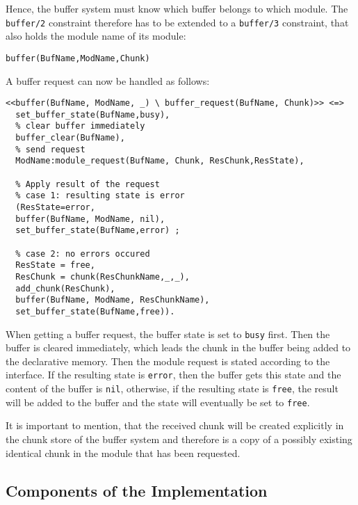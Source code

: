 Hence, the buffer system must know which buffer belongs to which module. The \lstinline|buffer/2| constraint therefore has to be extended to a \lstinline|buffer/3| constraint, that also holds the module name of its module:

\begin{lstlisting}
buffer(BufName,ModName,Chunk)
\end{lstlisting}

A buffer request can now be handled as follows:

\begin{lstlisting}[caption={Retrieval Request in CHR}, label=lst:retrieval_request_symbolic]
<<buffer(BufName, ModName, _) \ buffer_request(BufName, Chunk)>> <=>
  set_buffer_state(BufName,busy),
  % clear buffer immediately
  buffer_clear(BufName), 
  % send request
  ModName:module_request(BufName, Chunk, ResChunk,ResState),
  
  % Apply result of the request
  % case 1: resulting state is error
  (ResState=error, 
  buffer(BufName, ModName, nil),
  set_buffer_state(BufName,error) ;
  
  % case 2: no errors occured
  ResState = free,
  ResChunk = chunk(ResChunkName,_,_),
  add_chunk(ResChunk), 
  buffer(BufName, ModName, ResChunkName),
  set_buffer_state(BufName,free)).
\end{lstlisting}

When getting a buffer request, the buffer state is set to \lstinline|busy| first. Then the buffer is cleared immediately, which leads the chunk in the buffer being added to the declarative memory. Then the module request is stated according to the interface. If the resulting state is \lstinline|error|, then the buffer gets this state and the content of the buffer is \lstinline|nil|, otherwise, if the resulting state is \lstinline|free|, the result will be added to the buffer and the state will eventually be set to \lstinline|free|. 

It is important to mention, that the received chunk will be created explicitly in the chunk store of the buffer system and therefore is a copy of a possibly existing identical chunk in the module that has been requested.

\subsection{Components of the Implementation}
\label{implementation:components}

